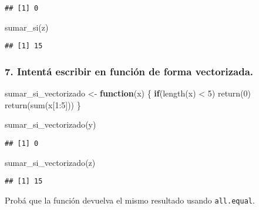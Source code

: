 \documentclass[
]{article}
\newenvironment{Shaded}{\begin{snugshade}}{\end{snugshade}}
\newcommand{\ControlFlowTok}[1]{\textcolor[rgb]{0.13,0.29,0.53}{\textbf{#1}}}
\newcommand{\DecValTok}[1]{\textcolor[rgb]{0.00,0.00,0.81}{#1}}
\newcommand{\FunctionTok}[1]{\textcolor[rgb]{0.00,0.00,0.00}{#1}}
\newcommand{\NormalTok}[1]{#1}
\newcommand{\OtherTok}[1]{\textcolor[rgb]{0.56,0.35,0.01}{#1}}
\newcommand{\SpecialCharTok}[1]{\textcolor[rgb]{0.00,0.00,0.00}{#1}}
\begin{document}
\begin{verbatim}
## [1] 0
\end{verbatim}

\begin{Shaded}
\begin{Highlighting}[]
\FunctionTok{sumar\_si}\NormalTok{(z)}
\end{Highlighting}
\end{Shaded}

\begin{verbatim}
## [1] 15
\end{verbatim}

\hypertarget{intentuxe1-escribir-en-funciuxf3n-de-forma-vectorizada.}{%
\subsubsection{7. Intentá escribir en función de forma
vectorizada.}\label{intentuxe1-escribir-en-funciuxf3n-de-forma-vectorizada.}}

\begin{Shaded}
\begin{Highlighting}[]
\NormalTok{sumar\_si\_vectorizado }\OtherTok{\textless{}{-}} \ControlFlowTok{function}\NormalTok{(x) \{}
  \ControlFlowTok{if}\NormalTok{(}\FunctionTok{length}\NormalTok{(x) }\SpecialCharTok{\textless{}} \DecValTok{5}\NormalTok{) }\FunctionTok{return}\NormalTok{(}\DecValTok{0}\NormalTok{)}
  \FunctionTok{return}\NormalTok{(}\FunctionTok{sum}\NormalTok{(x[}\DecValTok{1}\SpecialCharTok{:}\DecValTok{5}\NormalTok{]))}
\NormalTok{\}}

\FunctionTok{sumar\_si\_vectorizado}\NormalTok{(y)}
\end{Highlighting}
\end{Shaded}

\begin{verbatim}
## [1] 0
\end{verbatim}

\begin{Shaded}
\begin{Highlighting}[]
\FunctionTok{sumar\_si\_vectorizado}\NormalTok{(z)}
\end{Highlighting}
\end{Shaded}

\begin{verbatim}
## [1] 15
\end{verbatim}

Probá que la función devuelva el mismo resultado usando
\texttt{all.equal}.
\end{document}
